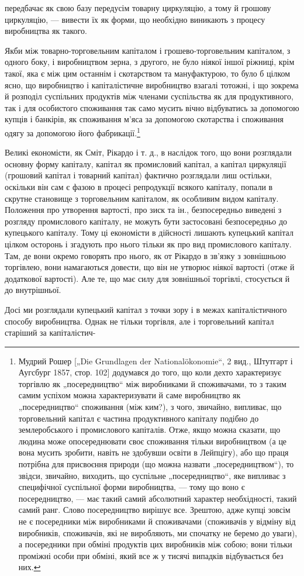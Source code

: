 передбачає як свою базу передусім товарну циркуляцію, а тому
й грошову циркуляцію, — вивести їх як форми, що необхідно
виникають з процесу виробництва як такого.

Якби між товарно-торговельним капіталом і грошево-торговельним
капіталом, з одного боку, і виробництвом зерна, з
другого, не було ніякої іншої ріжниці, крім такої, яка є між цим
останнім і скотарством та мануфактурою, то було б цілком
ясно, що виробництво і капіталістичне виробництво взагалі
тотожні, і що зокрема й розподіл суспільних продуктів між членами
суспільства як для продуктивного, так і для особистого
споживання так само мусить вічно відбуватись за допомогою
купців і банкірів, як споживання м’яса за допомогою скотарства
і споживання одягу за допомогою його фабрикації.\footnote{
Мудрий Рошер [„Die Grundlagen der Nationalökonomie“, 2 вид., Штутгарт
і Аугсбург 1857, стор. 102] додумався до того, що коли дехто характеризує
торгівлю як „посередництво“ між виробниками й споживачами, то з таким самим
успіхом можна характеризувати й саме виробництво як „посередництво“
споживання (між ким?), з чого, звичайно, випливає, що торговельний капітал
є частина продуктивного капіталу подібно до землеробського і промислового
капіталів. Отже, якщо можна сказати, що людина може опосереднювати своє
споживання тільки виробництвом (а це вона мусить зробити, навіть не здобувши
освіти в Лейпцігу), або що праця потрібна для присвоєння природи (що можна
назвати „посередництвом“), то звідси, звичайно, виходить, що суспільне „посередництво“, яке випливає
з специфічної суспільної форми виробництва, — тому
що воно є посередництво, — має такий самий абсолютний характер необхідності,
такий самий ранг. Слово посередництво вирішує все. Зрештою, адже купці зовсім
не є посередники між виробниками й споживачами (споживачів у відміну від виробників, споживачів, які
не виробляють, ми спочатку не беремо до уваги), а посередники при обміні продуктів цих виробників
між собою; вони тільки проміжні
особи при обміні, який все ж у тисячі випадків відбувається без них.
}

Великі економісти, як Сміт, Рікардо і т. д., в наслідок того,
що вони розглядали основну форму капіталу, капітал як промисловий
капітал, а капітал циркуляції (грошовий капітал і товарний
капітал) фактично розглядали лиш остільки, оскільки він
сам є фазою в процесі репродукції всякого капіталу, попали в
скрутне становище з торговельним капіталом, як особливим видом
капіталу. Положення про утворення вартості, про зиск та
ін., безпосередньо виведені з розгляду промислового капіталу,
не можуть бути застосовані безпосередньо до купецького капіталу.
Тому ці економісти в дійсності лишають купецький капітал
цілком осторонь і згадують про нього тільки як про вид
промислового капіталу. Там, де вони окремо говорять про
нього, як от Рікардо в зв’язку з зовнішньою торгівлею, вони
намагаються довести, що він не утворює ніякої вартості (отже
й додаткової вартості). Але те, що має силу для зовнішньої
торгівлі, стосується й до внутрішньої.

Досі ми розглядали купецький капітал з точки зору і в межах
капіталістичного способу виробництва. Однак не тільки торгівля,
але і торговельний капітал старіший за капіталістич-